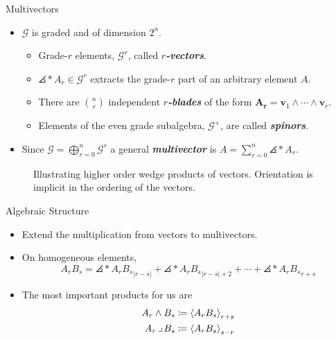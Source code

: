 \documentclass[aspectratio=169,handout]{beamer}
\newcommand\boldgreen[1]{\textcolor{lighter_csu_green}{\emph{\textbf{#1}}}}
\newcommand{\G}{\mathcal{G}}
\newcommand{\blade}[1]{\boldsymbol{#1}}
\newcommand{\contract}{\hspace*{.5mm} \lrcorner \hspace*{.5mm}}
\DeclarePairedDelimiter\angles{\langle}{\rangle}
\newcommand{\proj}[2]{\angles*{#2}_{#1}}
\begin{document}
\begin{frame}{Multivectors}
\vfill
\begin{itemize}
    \pause
        \item $\G$ is graded and of dimension $2^n$.
    \begin{itemize}
        \pause
        \item Grade-$r$ elements, $\G^r$, called \boldgreen{$r$-vectors}.
        \pause
        \item $\proj{r}{A}\in \G^r$ extracts the grade-$r$ part of an arbitrary element $A$.
        \pause
        \item There are ${n \choose r}$ independent \boldgreen{$r$-blades} of the form $\blade{A_r}=\blade{v}_1 \wedge \cdots \wedge\blade{v}_r$.
        \pause
        \item Elements of the even grade subalgebra, $\G^+$, are called \boldgreen{spinors}.
    \end{itemize}
        \pause
        \item Since $\displaystyle{\G=\bigoplus_{r=0}^n \G^r}$ a general \boldgreen{multivector} is $\displaystyle{A = \sum_{r=0}^n \proj{r}{A}}$.
\end{itemize}

\begin{figure}[H]
    \centering
    \def\svgwidth{\columnwidth}
\resizebox{\textwidth}{!}{}
    \caption{Illustrating higher order wedge products of vectors. Orientation is implicit in the ordering of the vectors.}
    \label{fig:wedge_product}
\end{figure}
\vfill
\end{frame}

\begin{frame}{Algebraic Structure}
\vfill
\begin{itemize}
\pause
\item Extend the multiplication from vectors to multivectors.
\pause
\item On homogeneous elements,
\[
A_r B_s = \proj{|r-s|}{A_r B_s} + \proj{|r-s|+2}{A_r B_s} + \cdots + \proj{r+s}{A_r B_s}
\]
\pause
\item The most important products for us are
\begin{align*}
A_r \wedge B_s &\coloneqq \proj{r+s}{A_r B_s}\\
{A_r} \contract B_s &\coloneqq \proj{s-r}{A_r B_s}
\end{align*}
\end{itemize}
\vfill
\end{frame}
\end{document}
